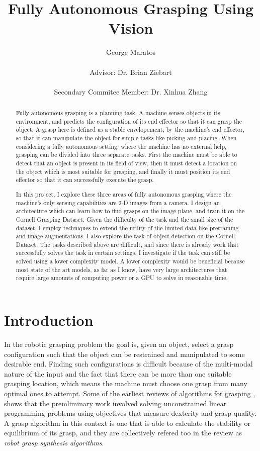 \documentclass{article}
\title{Fully Autonomous Grasping Using Vision}
\author{George Maratos\\\\Advisor: Dr. Brian Ziebart\\\\Secondary Commitee Member: Dr. Xinhua Zhang}
\begin{document}
\maketitle

\newpage
\begin{abstract}
Fully autonomous grasping is a planning task. A machine senses objects in its
environment, and predicts the configuration of its end effector so that it can
grasp the object. A grasp here is defined as a stable envelopement, by the machine's
end effector, so that it can manipulate the object for simple tasks like picking
and placing. When considering a fully autonomous setting, where the machine has no
external help, grasping can be divided into three separate tasks. First the machine
must be able to detect that an object is present in its field of view, then it must
detect a location on the object which is most suitable for grasping, and finally
it must position its end effector so that it can successfully execute the grasp.

In this project, I explore these three areas of fully autonomous grasping where the
machine's only sensing capabilities are 2-D images from a camera. I design an
architecture which can learn how to find grasps on the image plane, and train it
on the Cornell Grasping Dataset. Given the difficulty of the task and the
small size of the dataset, I employ techniques to extend the utility of the
limited data like pretraining and image augmentations. I also explore the task
of object detection on the Cornell Dataset. The tasks described above are
difficult, and since there is already work that successfully solves the task
in certain settings, I investigate if the task can still be solved
using a lower complexity model. A lower complexity would be beneficial because
most state of the art models, as far as I know, have very large architectures
that require large amounts of computing power or a GPU to solve in reasonable time.

\end{abstract}

\newpage
\section{Introduction}
In the robotic grasping problem the goal is, given an object, select a grasp
configuration such that the object can be restrained and
manipulated to some desirable end. Finding such configurations is difficult
because of the multi-modal nature of the input and the fact that there can be
more than one suitable grasping location, which means the machine must choose
one grasp from many optimal ones to attempt.
Some of the earliest reviews of algorithms for grasping \cite{shimoga96,bicchi00},
shows that the premliminary work involved solving unconstrained linear programming
problems using objectives that measure dexterity and grasp quality. A grasp
algorithm in this context is one that is able to calculate the stability or
equilibrium of its grasp, and they are collectively refered too in the
review as \textit{robot grasp synthesis algorithms}.
\end{document}
